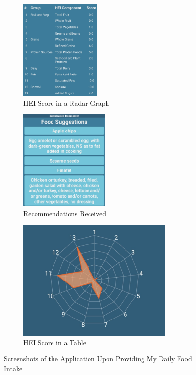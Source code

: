 \documentclass{article}
\begin{document}
\begin{figure}[h]
\centering
\hspace*{-1cm} 
\begin{subfigure}{.5\textwidth}
  \centering
  \includegraphics[height = 5cm]{my_input_hei_table.jpg}
  \caption{HEI Score in a Radar Graph}
  \label{fig:my_input_hei_radar_graph}
\end{subfigure}%
\begin{subfigure}{.4\textwidth}
  \centering
  \includegraphics[height = 5cm]{my_input_recommendations.jpg}
  \caption{Recommendations Received}
  \label{fig:my_input_recommendations}
\end{subfigure}
\begin{subfigure}{\textwidth}
  \centering
  \includegraphics[height = 6cm]{my_input_hei_radar_graph.jpg}
  \caption{HEI Score in a Table}
  \label{fig:my_input_hei_table}
\end{subfigure}
\caption{Screenshots of the Application Upon Providing My Daily Food Intake}
\label{fig:my_input_results}
\end{figure}
\end{document}
